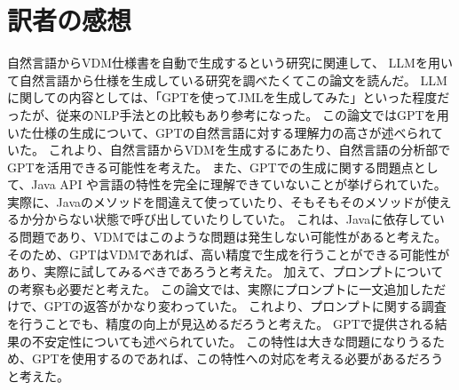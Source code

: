 \documentclass[uplatex, twocolumn, 10pt]{jsarticle} %
\begin{document}
\section*{訳者の感想}
自然言語からVDM仕様書を自動で生成するという研究に関連して、
LLMを用いて自然言語から仕様を生成している研究を調べたくてこの論文を読んだ。
LLMに関しての内容としては、「GPTを使ってJMLを生成してみた」といった程度だったが、従来のNLP手法との比較もあり参考になった。
この論文ではGPTを用いた仕様の生成について、GPTの自然言語に対する理解力の高さが述べられていた。
これより、自然言語からVDMを生成するにあたり、自然言語の分析部でGPTを活用できる可能性を考えた。
また、GPTでの生成に関する問題点として、Java API や言語の特性を完全に理解できていないことが挙げられていた。
実際に、Javaのメソッドを間違えて使っていたり、そもそもそのメソッドが使えるか分からない状態で呼び出していたりしていた。
これは、Javaに依存している問題であり、VDMではこのような問題は発生しない可能性があると考えた。
そのため、GPTはVDMであれば、高い精度で生成を行うことができる可能性があり、実際に試してみるべきであろうと考えた。
加えて、プロンプトについての考察も必要だと考えた。
この論文では、実際にプロンプトに一文追加しただけで、GPTの返答がかなり変わっていた。
これより、プロンプトに関する調査を行うことでも、精度の向上が見込めるだろうと考えた。
GPTで提供される結果の不安定性についても述べられていた。
この特性は大きな問題になりうるため、GPTを使用するのであれば、この特性への対応を考える必要があるだろうと考えた。
\end{document}
